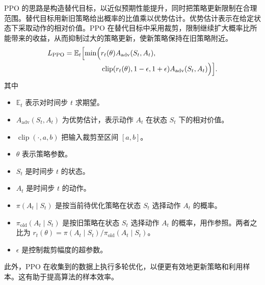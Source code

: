 PPO 的思路是构造替代目标，以近似预期性能提升，同时把策略更新限制在合理范围。替代目标用新旧策略给出概率的比值乘以优势估计。优势估计表示在给定状态下采取动作的相对价值。PPO 在替代目标中采用裁剪，限制继续扩大概率比所能带来的收益，从而抑制过大的策略更新，使新策略保持在旧策略附近。
\begin{equation}
\begin{aligned}
L_{\mathrm{PPO}}=\mathbb{E}_t\Bigl[\min\Bigl(&
r_t(\theta)A_{\mathrm{adv}}(S_t,A_t),\\
&\operatorname{clip}(r_t(\theta),1-\epsilon,1+\epsilon)
  A_{\mathrm{adv}}(S_t,A_t)\Bigr)\Bigr].
\end{aligned}
\label{eq:appb-ppo}
\end{equation}
其中
\begin{itemize}
\item $\mathbb{E}_t$ 表示对时间步 $t$ 求期望。
\item $A_{\mathrm{adv}}(S_t,A_t)$ 为优势估计，表示动作 $A_t$ 在状态 $S_t$ 下的相对价值。
\item $\operatorname{clip}(\cdot,a,b)$ 把输入裁剪至区间 $[a,b]$。
\item $\theta$ 表示策略参数。
\item $S_t$ 是时间步 $t$ 的状态。
\item $A_t$ 是时间步 $t$ 的动作。
\item $\pi(A_t\mid S_t)$ 是按当前待优化策略在状态 $S_t$ 选择动作 $A_t$ 的概率。
\item $\pi_{\mathrm{old}}(A_t\mid S_t)$ 是按旧策略在状态 $S_t$ 选择动作 $A_t$ 的概率，用作参照。两者之比为 $r_t(\theta)=\pi(A_t\mid S_t)/\pi_{\mathrm{old}}(A_t\mid S_t)$。
\item $\epsilon$ 是控制裁剪幅度的超参数。
\end{itemize}
此外，PPO 在收集到的数据上执行多轮优化，以便更有效地更新策略和利用样本。这有助于提高算法的样本效率。
